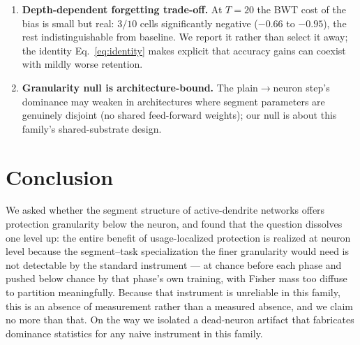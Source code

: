 \documentclass[review,12pt,number]{elsarticle}
\begin{document}
\begin{enumerate}
      We also tested scheduled variants
      (Suppl.~S4): an annealed bias ($b_p = 10(1-p/T)$) retains
      $91$--$103\%$ of the constant-bias learning gain at $T{=}20$ but
      does not reliably remove the BWT cost (significant improvement in
      one of two datasets only), while a ramped bias ($b_p = 10p/(T{-}1)$)
      \emph{exceeds} the constant gain everywhere ($123$--$197\%$
      retention, $t \ge 2.6$) at an equally or more negative BWT cost.
      Scheduling moves along the retention--plasticity frontier ---
      tracking cumulative bias exposure, not timing --- but does not
      move the frontier itself; separating gain from cost appears to
      require a mechanism (e.g.\ task-staggered protection), not a
      schedule.
\item \textbf{Depth-dependent forgetting trade-off.} At $T{=}20$ the BWT
      cost of the bias is small but real: $3/10$ cells significantly
      negative ($-0.66$ to $-0.95$), the rest indistinguishable from
      baseline. We
      report it rather than select it away; the identity
      Eq.~\eqref{eq:identity} makes explicit that accuracy gains can
      coexist with mildly worse retention.
\item \textbf{Granularity null is architecture-bound.} The
      plain$\to$neuron step's dominance may weaken in architectures where
      segment parameters are genuinely disjoint (no shared feed-forward
      weights); our null is about this family's shared-substrate design.
\end{enumerate}



\section{Conclusion}
\label{sec:conclusion}

We asked whether the segment structure of active-dendrite networks offers
protection granularity below the neuron, and found that the question
dissolves one level up: the entire benefit of usage-localized protection is
realized at neuron level because the segment--task specialization the finer
granularity would need is not detectable by the standard instrument --- at
chance before each phase and pushed below chance by that phase's own training,
with Fisher mass too diffuse to partition meaningfully. Because that
instrument is unreliable in this family, this is an absence of measurement
rather than a measured absence, and we claim no more than that. On the way we isolated a dead-neuron artifact that
fabricates dominance statistics for any naive instrument in this family.
\end{document}
